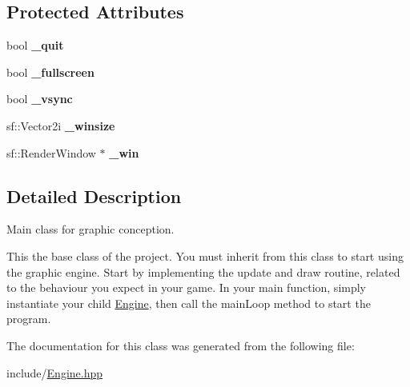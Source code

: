 \subsection*{Protected Attributes}
\begin{DoxyCompactItemize}
\item 
bool {\bfseries \+\_\+quit}\hypertarget{classEngine_a898920050b07866ea40f064d70cea2d3}{}\label{classEngine_a898920050b07866ea40f064d70cea2d3}

\item 
bool {\bfseries \+\_\+fullscreen}\hypertarget{classEngine_abbf1a2a867c7d984635649f4b31445be}{}\label{classEngine_abbf1a2a867c7d984635649f4b31445be}

\item 
bool {\bfseries \+\_\+vsync}\hypertarget{classEngine_a4335fc7280d9f08bb1782ff1468a0a7e}{}\label{classEngine_a4335fc7280d9f08bb1782ff1468a0a7e}

\item 
sf\+::\+Vector2i {\bfseries \+\_\+winsize}\hypertarget{classEngine_a08d9946ba478761a9daedef99e7515ff}{}\label{classEngine_a08d9946ba478761a9daedef99e7515ff}

\item 
sf\+::\+Render\+Window $\ast$ {\bfseries \+\_\+win}\hypertarget{classEngine_a8b0032aa2e805db98a6c73fd399b639e}{}\label{classEngine_a8b0032aa2e805db98a6c73fd399b639e}

\end{DoxyCompactItemize}


\subsection{Detailed Description}
Main class for graphic conception. 

This the base class of the project. You must inherit from this class to start using the graphic engine. Start by implementing the update and draw routine, related to the behaviour you expect in your game. In your main function, simply instantiate your child \hyperlink{classEngine}{Engine}, then call the main\+Loop method to start the program. 

The documentation for this class was generated from the following file\+:\begin{DoxyCompactItemize}
\item 
include/\hyperlink{Engine_8hpp}{Engine.\+hpp}\end{DoxyCompactItemize}
